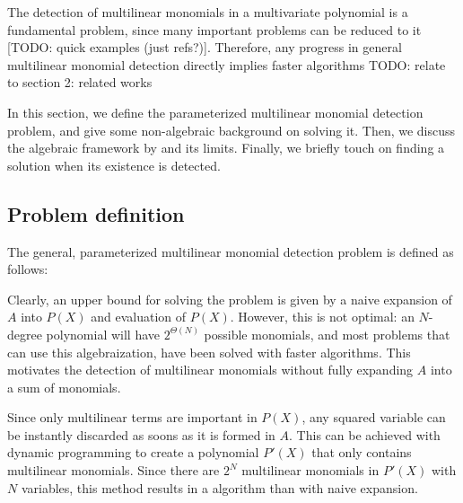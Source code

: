The detection of multilinear monomials in a multivariate polynomial is a fundamental problem, 
since many important problems can be reduced to it [TODO: quick examples (just refs?)]. 
Therefore, any progress in general multilinear monomial detection directly implies 
faster algorithms
 TODO: relate to section 2: related works

In this section, we define the parameterized multilinear monomial detection problem, 
and give some non-algebraic background on solving it. Then, we discuss the 
algebraic framework by \citeauthor{KouWil15} \cite{Williams09, KouWil15} 
and its limits. Finally, we briefly touch on finding a solution when 
its existence is detected.

\subsection{Problem definition}

The general, parameterized multilinear monomial detection problem is defined as follows: 

\begin{problem}
\end{problem}

Clearly, an upper bound for solving the problem is given by a 
naive expansion of $A$ into $P(X)$ and evaluation of $P(X)$.
However, this is not optimal: an $N$-degree polynomial will have $2^{\Theta(N)}$ 
possible monomials, and most problems that can use this algebraization, 
have been solved with faster algorithms. %
This motivates the detection of multilinear monomials 
without fully expanding $A$ into a sum of monomials.

Since only multilinear terms are important in $P(X)$, 
any squared variable can be instantly discarded as soons as it is formed in $A$. 
This can be achieved with dynamic programming to create a polynomial $P'(X)$ that 
only contains multilinear monomials. Since there are $2^N$ multilinear monomials in $P'(X)$ with 
$N$ variables, this method results in a
 algorithm than with naive expansion.

